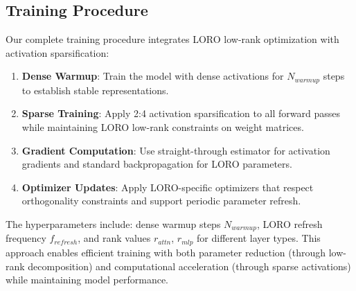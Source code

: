 \subsection{Training Procedure}

Our complete training procedure integrates LORO low-rank optimization with activation sparsification:

\begin{enumerate}
\item \textbf{Dense Warmup}: Train the model with dense activations for $N_{warmup}$ steps to establish stable representations.
\item \textbf{Sparse Training}: Apply 2:4 activation sparsification to all forward passes while maintaining LORO low-rank constraints on weight matrices.
\item \textbf{Gradient Computation}: Use straight-through estimator for activation gradients and standard backpropagation for LORO parameters.
\item \textbf{Optimizer Updates}: Apply LORO-specific optimizers that respect orthogonality constraints and support periodic parameter refresh.
\end{enumerate}

The hyperparameters include: dense warmup steps $N_{warmup}$, LORO refresh frequency $f_{refresh}$, and rank values $r_{attn}$, $r_{mlp}$ for different layer types. This approach enables efficient training with both parameter reduction (through low-rank decomposition) and computational acceleration (through sparse activations) while maintaining model performance.